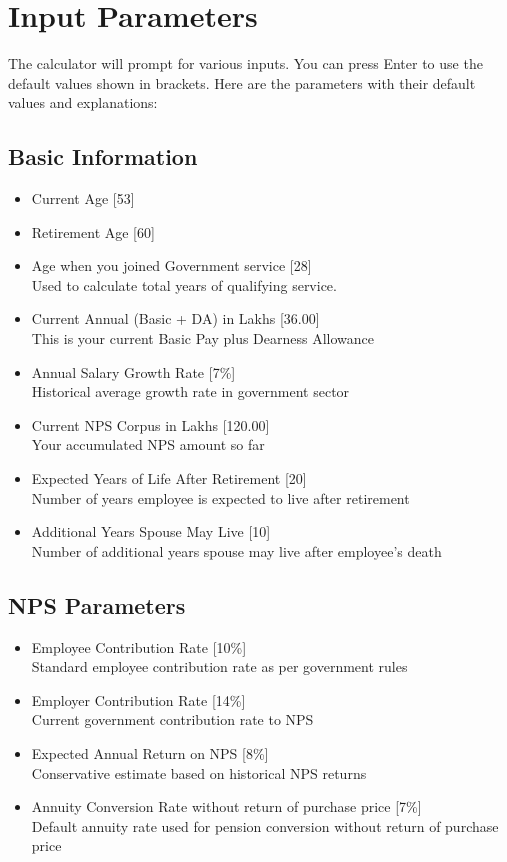 \documentclass{article}
\begin{document}
\section{Input Parameters}
The calculator will prompt for various inputs. You can press Enter to use the default values shown in brackets. Here are the parameters with their default values and explanations:

\subsection{Basic Information}
\begin{itemize}
    \item Current Age [53]
    \item Retirement Age [60]
    \item Age when you joined Government service [28] \\
          Used to calculate total years of qualifying service.
    \item Current Annual (Basic + DA) in Lakhs [36.00] \\
          This is your current Basic Pay plus Dearness Allowance
    \item Annual Salary Growth Rate [7\%] \\
          Historical average growth rate in government sector
    \item Current NPS Corpus in Lakhs [120.00] \\
          Your accumulated NPS amount so far
    \item Expected Years of Life After Retirement [20] \\
          Number of years employee is expected to live after retirement
    \item Additional Years Spouse May Live [10] \\
          Number of additional years spouse may live after employee's death
\end{itemize}

\subsection{NPS Parameters}
\begin{itemize}
    \item Employee Contribution Rate [10\%] \\
          Standard employee contribution rate as per government rules
    \item Employer Contribution Rate [14\%] \\
          Current government contribution rate to NPS
    \item Expected Annual Return on NPS [8\%] \\
          Conservative estimate based on historical NPS returns
    \item Annuity Conversion Rate without return of purchase price [7\%] \\
          Default annuity rate used for pension conversion without return of purchase price
\end{itemize}
\end{document}
